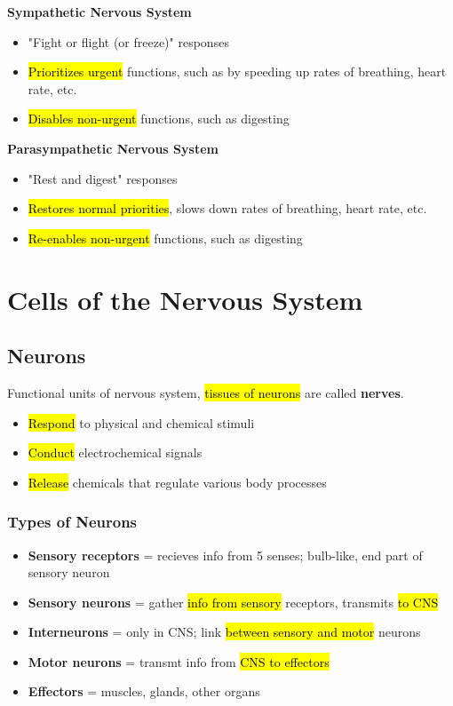 \documentclass[a4paper,12pt]{article}
\begin{document}
\textbf{Sympathetic Nervous System}
\begin{itemize}
    \item{"Fight or flight (or freeze)" responses}
    \item{\hl{Prioritizes urgent} functions, such as by speeding up rates of breathing, heart rate, etc.}
    \item{\hl{Disables non-urgent} functions, such as digesting}
        \\
\end{itemize}

\textbf{Parasympathetic Nervous System}
\begin{itemize}
    \item{"Rest and digest" responses}
    \item{\hl{Restores normal priorities}, slows down rates of breathing, heart rate, etc.}
    \item{\hl{Re-enables non-urgent} functions, such as digesting}
\end{itemize}

\pagebreak

\section{Cells of the Nervous System}
\subsection{Neurons}
Functional units of nervous system, \hl{tissues of neurons} are called \textbf{nerves}.
\begin{itemize}
    \item{\hl{Respond} to physical and chemical stimuli}
    \item{\hl{Conduct} electrochemical signals}
    \item{\hl{Release} chemicals that regulate various body processes}
\end{itemize}

\subsubsection{Types of Neurons}
\begin{itemize}
    \item{\textbf{Sensory receptors} = recieves info from 5 senses; bulb-like, end part of sensory neuron}
    \item{\textbf{Sensory neurons} = gather \hl{info from sensory} receptors, transmits \hl{to CNS}}
    \item{\textbf{Interneurons} = only in CNS; link \hl{between sensory and motor} neurons}
    \item{\textbf{Motor neurons} = transmt info from \hl{CNS to effectors}}
    \item{\textbf{Effectors} = muscles, glands, other organs}
\end{itemize}
\end{document}
